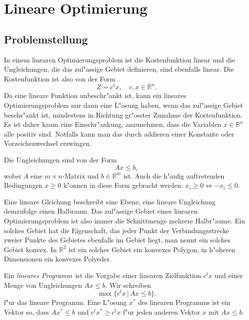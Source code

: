 \chapter{Lineare Optimierung\label{chapter-lineare-optimierung}}

\section{Problemstellung\label{lp:section:problem}}
In einem linearen Optimierungsproblem ist die Kostenfunktion linear
und die Ungleichungen, die das zul"assige Gebiet definieren, sind
ebenfalls linear. 
Die Kostenfunktion ist also von der Form
\[
Z=c^tx,\quad c,x\in\mathbb R^n.
\]
Da eine lineare Funktion unbeschr"ankt ist, kann ein lineares
Optimierungsproblem nur dann eine L"osung haben, wenn das zul"assige
Gebiet beschr"ankt ist, mindestens in Richtung gr"osster Zunahme der
Kostenfunktion. Es ist daher kaum eine Einschr"ankung, anzunehmen, dass 
die Variablen $x\in\mathbb R^n$ alle positiv sind. Notfalls kann man 
das durch addieren einer Konstante oder Vorzeichenwechsel erzwingen.

Die Ungleichungen sind von der Form
\[
Ax\le b,
\]
wobei $A$ eine $m\times n$-Matrix und $b\in\mathbb R^m$ ist.
Auch die h"aufig auftretenden Bedingungen $x\ge 0$ k"onnen in
diese Form gebracht werden: $x_i\ge 0\Leftrightarrow -x_i \le 0$.

Eine lineare Gleichung beschreibt eine Ebene, eine
lineare Ungleichung demzufolge einen Halbraum. Das zul"assige Gebiet
eines linearen Optimierungsproblem ist also immer die Schnittmenge
mehrere Halbr"aume.
Ein solches Gebiet hat die Eigenschaft, das jeder Punkt der
Verbindungsstrecke zweier Punkte des Gebietes ebenfalls im Gebiet liegt,
man nennt ein solches Gebiet konvex.
In $\mathbb R^2$  ist ein solches Gebiet ein konvexes Polygon,
in h"oheren Dimensionen ein konvexes Polyeder.

\begin{definition}
Ein {\em lineares Programm} ist die Vorgabe einer linearen Zielfunktion
$c^tx$ und einer Menge von Ungleichungen $Ax\le b$.
Wir schreiben
\[
\max\{c^tx\,|\,Ax\le b\}.
\]
f"ur das lineare Programm. Eine L"osung $x^*$ des linearen Programms
ist ein Vektor so, dass $Ax^*\le b$ und $c^tx^*\ge c^tx$ f"ur jeden
anderen Vektor $x$ mit $Ax\le b$.
\end{definition}

